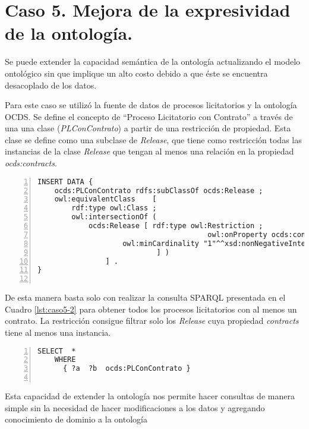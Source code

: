 \section{Caso 5. Mejora de la expresividad de la ontología. }

Se puede extender la capacidad semántica de la ontología actualizando el modelo ontológico sin que implique un alto costo debido a que éste se encuentra desacoplado de los datos.

Para este caso se utilizó la fuente de datos de procesos licitatorios y la ontología OCDS. Se define el concepto de “Proceso Licitatorio con Contrato” a través de una una clase (\textit{PLConContrato}) a partir de una restricción de propiedad. Esta clase se define como una subclase de \textit{Release}, que tiene como restricción todas las instancias de la clase \textit{Release} que tengan al menos una relación en la propiedad \textit{ocds:contracts}.\hfill \break


\noindent\begin{minipage}[c]{\textwidth}
\begin{lstlisting}[captionpos=b, caption=Extension de la ontologia utilizando restricciones ontologicas, label={lst:caso5-1},  numbers=left,  numberstyle=\tiny\color{mygray},
    basicstyle=\footnotesize\ttfamily,frame=single]
INSERT DATA {
    ocds:PLConContrato rdfs:subClassOf ocds:Release ; 
    owl:equivalentClass    [ 
        rdf:type owl:Class ;
        owl:intersectionOf (   
            ocds:Release [ rdf:type owl:Restriction ;
                                        owl:onProperty ocds:contracts; 
                    owl:minCardinality "1"^^xsd:nonNegativeInteger ;
                            ] )
                ] .
}
    
 \end{lstlisting}
\end{minipage}
 De esta manera basta solo con realizar la consulta SPARQL presentada en el Cuadro \ref{lst:caso5-2} para obtener todos los procesos licitatorios con al menos un contrato. La restricción consigue filtrar solo los \textit{Release} cuya propiedad \textit{contracts} tiene al menos una instancia.\hfill \break

\noindent\begin{minipage}[c]{\textwidth}
 \begin{lstlisting}[captionpos=b, caption=Consulta SPARQL utilizando la Clase PLConContrato, label=lst:caso5-2,  numbers=left,  numberstyle=\tiny\color{mygray},
    basicstyle=\footnotesize\ttfamily,frame=single]
SELECT  *
    WHERE
      { ?a  ?b  ocds:PLConContrato }
    
 \end{lstlisting}
\end{minipage}
 Esta capacidad de extender la ontología nos permite hacer consultas de manera simple sin la necesidad de hacer modificaciones a los datos y agregando conocimiento de dominio a la ontología